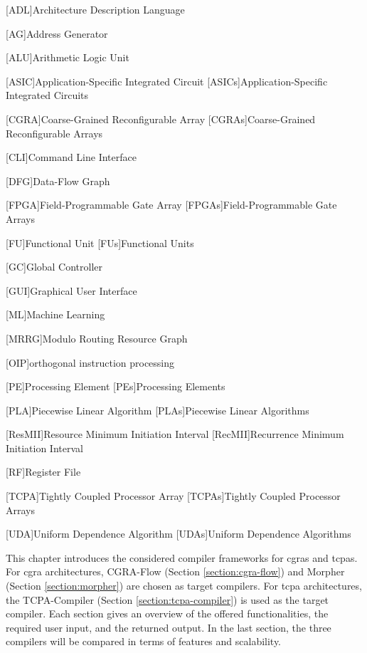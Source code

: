 \begin{acronym}
  [ADL]{Architecture Description Language}

  [AG]{Address Generator}

  [ALU]{Arithmetic Logic Unit}

  [ASIC]{Application-Specific Integrated Circuit}
  [ASICs]{Application-Specific Integrated Circuits}

  [CGRA]{Coarse-Grained Reconfigurable Array}
  [CGRAs]{Coarse-Grained Reconfigurable Arrays}

  [CLI]{Command Line Interface}
  
  [DFG]{Data-Flow Graph}
  
  [FPGA]{Field-Programmable Gate Array}
  [FPGAs]{Field-Programmable Gate Arrays}
  
  [FU]{Functional Unit}
  [FUs]{Functional Units}

  [GC]{Global Controller}

  [GUI]{Graphical User Interface}

  [ML]{Machine Learning}

  [MRRG]{Modulo Routing Resource Graph}

  [OIP]{orthogonal instruction processing}

  [PE]{Processing Element}
  [PEs]{Processing Elements}

  [PLA]{Piecewise Linear Algorithm}
  [PLAs]{Piecewise Linear Algorithms}

  [ResMII]{Resource Minimum Initiation Interval}
  [RecMII]{Recurrence Minimum Initiation Interval}

  [RF]{Register File}
  
  [TCPA]{Tightly Coupled Processor Array}
  [TCPAs]{Tightly Coupled Processor Arrays}

  [UDA]{Uniform Dependence Algorithm}
  [UDAs]{Uniform Dependence Algorithms}
\end{acronym}

This chapter introduces the considered compiler frameworks for \acfp{cgra} and \acfp{tcpa}.
For \ac{cgra} architectures, CGRA-Flow (Section \ref{section:cgra-flow}) and Morpher (Section \ref{section:morpher}) are chosen as target compilers.
For \ac{tcpa} architectures, the TCPA-Compiler (Section \ref{section:tcpa-compiler}) is used as the target compiler.
Each section gives an overview of the offered functionalities, the required user input, and the returned output.
In the last section, the three compilers will be compared in terms of features and scalability.



